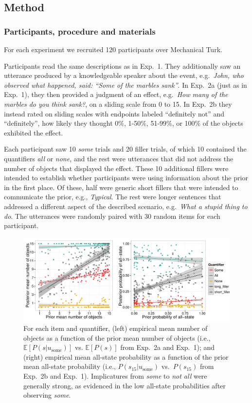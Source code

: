 \documentclass[10pt,letterpaper]{article}
\begin{document}
\subsection{Method}

\subsubsection{Participants, procedure and materials}

For each experiment we recruited 120 participants over Mechanical Turk.

Participants read the same descriptions as in Exp.~1. They additionally saw an utterance produced by a knowledgeable speaker about the event, e.g.~\textit{John, who observed what happened, said: ``Some of the marbles sank''}. In Exp.~2a (just as in Exp.~1), they then provided a judgment of an effect, e.g.~\textit{How many of the marbles do you think sank?}, on a sliding scale from 0 to 15. In Exp.~2b they instead rated on sliding scales with endpoints labeled ``definitely not'' and ``definitely'', how likely they thought 0\%, 1-50\%, 51-99\%, or 100\% of the objects exhibited the effect.

Each participant saw 10 \emph{some} trials and 20 filler trials, of which 10 contained the quantifiers \emph{all} or \emph{none}, and the rest were utterances that did not address the number of objects that displayed the effect. These 10 additional fillers were intended to establish whether participants were using information about the prior in the first place. Of these, half were generic short fillers that were intended to communicate the prior, e.g., \emph{Typical}. The rest were longer sentences that addressed a different aspect of the described scenario, e.g.~\emph{What a stupid thing to do}. The utterances were randomly paired with 30 random items for each participant.

 
\begin{figure}
\centering
	\includegraphics[width=.8\textwidth]{pics/empirical-results}	
	\caption{For each item and quantifier, (left) empirical mean number of objects as a function of the prior mean number of objects (i.e.,  $\mathbb{E}[P(s|u_{\textrm{some}})]$ vs. $\mathbb{E}[P(s)]$ from Exp.~2a and Exp.~1); and (right) empirical mean all-state probability as a function of the prior mean all-state probability (i.e., $P(s_{15}|u_{\textrm{some}})$ vs.~$P(s_{15})$ from Exp.~2b and Exp.~1). Implicatures from \emph{some} to \emph{not all} were generally strong, as evidenced in the low all-state probabilities after observing \emph{some}.}
	\label{fig:empiricalresults}	
\end{figure}
\end{document}
